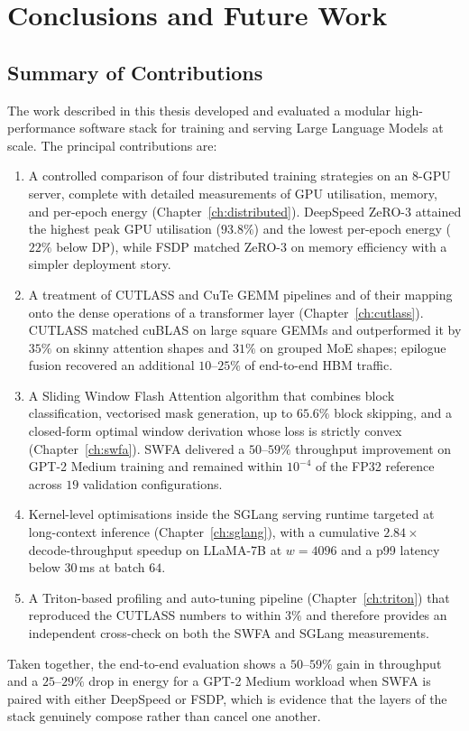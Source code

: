 \chapter{Conclusions and Future Work}\label{ch:conclusion}

\section{Summary of Contributions}\label{sec:concl_summary}
The work described in this thesis developed and evaluated a
modular high-performance software stack for training and serving
Large Language Models at scale. The principal contributions are:
\begin{enumerate}
    \item A controlled comparison of four distributed training
          strategies on an 8-GPU server, complete with detailed
          measurements of GPU utilisation, memory, and per-epoch
          energy (Chapter~\ref{ch:distributed}). DeepSpeed ZeRO-3
          attained the highest peak GPU utilisation ($93.8\%$)
          and the lowest per-epoch energy ($22\%$ below DP), while
          FSDP matched ZeRO-3 on memory efficiency with a simpler
          deployment story.
    \item A treatment of CUTLASS and CuTe GEMM pipelines and of
          their mapping onto the dense operations of a transformer
          layer (Chapter~\ref{ch:cutlass}). CUTLASS matched cuBLAS
          on large square GEMMs and outperformed it by $35\%$ on
          skinny attention shapes and $31\%$ on grouped MoE
          shapes; epilogue fusion recovered an additional
          $10$--$25\%$ of end-to-end HBM traffic.
    \item A Sliding Window Flash Attention algorithm that combines
          block classification, vectorised mask generation, up to
          $65.6\%$ block skipping, and a closed-form optimal
          window derivation whose loss is strictly convex
          (Chapter~\ref{ch:swfa}). SWFA delivered a
          $50$--$59\%$ throughput improvement on GPT-2 Medium
          training and remained within $10^{-4}$ of the FP32
          reference across $19$ validation configurations.
    \item Kernel-level optimisations inside the SGLang serving
          runtime targeted at long-context inference
          (Chapter~\ref{ch:sglang}), with a cumulative
          $2.84\times$ decode-throughput speedup on LLaMA-7B at
          $w = 4096$ and a p99 latency below $30$\,ms at batch
          $64$.
    \item A Triton-based profiling and auto-tuning pipeline
          (Chapter~\ref{ch:triton}) that reproduced the CUTLASS
          numbers to within $3\%$ and therefore provides an
          independent cross-check on both the SWFA and SGLang
          measurements.
\end{enumerate}
Taken together, the end-to-end evaluation shows a
$50$--$59\%$ gain in throughput and a $25$--$29\%$ drop in
energy for a GPT-2 Medium workload when SWFA is paired with
either DeepSpeed or FSDP, which is evidence that the layers of
the stack genuinely compose rather than cancel one another.

